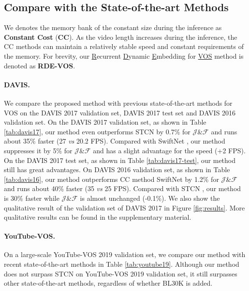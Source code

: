 \documentclass[10pt,twocolumn,letterpaper]{article}
\begin{document}
\subsection{Compare with the State-of-the-art Methods}
We denotes the memory bank of the constant size during the inference as \textbf{Constant Cost} (\textbf{CC}). As the video length increases during the inference, the CC methods can maintain a relatively stable speed and constant requirements of the memory.
For brevity, our \uline{R}ecurrent \uline{D}ynamic \uline{E}mbedding for  \uline{VOS} method is denoted as \textbf{RDE-VOS}. 
\vspace{-0.7em}
\paragraph{DAVIS.}
We compare the proposed method with previous state-of-the-art methods for VOS on the DAVIS 2017 validation set, DAVIS 2017 test set and DAVIS 2016 validation set.  On the DAVIS 2017 validation set, as shown in Table \ref{tab:davis17}, our method even outperforms STCN \cite{cheng2021rethinking} by 0.7\% for {$\mathcal{J}$\&$\mathcal{F}$} and runs about 35\% faster (27 \textit{vs} 20.2 FPS). Compared with SwiftNet \cite{wang2021swiftnet}, our method suppresses it by 5\%  for {$\mathcal{J}$\&$\mathcal{F}$} and has a slight advantage for the speed (+2 FPS). On the DAVIS 2017 test set, as shown in Table \ref{tab:davis17-test}, our method still has great advantages. On DAVIS 2016 validation set, as shown in Table \ref{tab:davis16}, our method outperforms CC method SwiftNet \cite{wang2021swiftnet} by 1.2\% for {$\mathcal{J}$\&$\mathcal{F}$} and runs about 40\% faster (35 \textit{vs} 25 FPS). Compared with STCN \cite{cheng2021rethinking}, our method is 30\% faster while {$\mathcal{J}$\&$\mathcal{F}$} is almost unchanged (-0.1\%). We also show the qualitative result of the validation set of DAVIS 2017 in Figure \ref{fig:results}. More qualitative results can be found in the supplementary material. 


\vspace{-0.5em}
\paragraph{YouTube-VOS.}
On a large-scale YouTube-VOS 2019 validation set, we compare our method with recent state-of-the-art methods in Table \ref{tab:youtube19}. Although our method does not surpass STCN on YouTube-VOS 2019 validation set, it still surpasses other state-of-the-art methods, regardless of whether BL30K is added.
\vspace{-1em}
\end{document}
